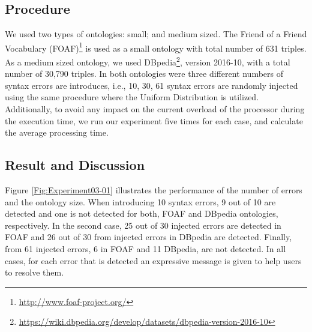 \subsection{Procedure}

We used two types of ontologies: small; and medium sized. 
The Friend of a Friend Vocabulary (FOAF)\footnote{\url{http://www.foaf-project.org/}} is used as a small ontology with total number of 631 triples. 
As a medium sized ontology, we used DBpedia\footnote{\url{https://wiki.dbpedia.org/develop/datasets/dbpedia-version-2016-10}}, version 2016-10, with a total number of 30,790 triples. 
In both ontologies were three different numbers of syntax errors are introduces, i.e., 10, 30, 61 syntax errors are randomly injected using the same procedure where the Uniform Distribution is utilized.
Additionally, to avoid any impact on the current overload of the processor during the execution time, we run our experiment five times for each case, and calculate the average processing time.

 
\subsection{Result and Discussion}

Figure \ref{Fig:Experiment03-01} illustrates the performance of the number of errors and the ontology size. 
When introducing 10 syntax errors, 9 out of 10 are detected and one is not detected for both, FOAF and DBpedia ontologies, respectively. 
In the second case, 25 out of 30 injected errors are detected in FOAF and 26 out of 30 from injected errors in DBpedia are detected. 
Finally, from 61 injected errors, 6 in FOAF and 11 DBpedia, are not detected.
In all cases, for each error that is detected an expressive message is given to help users to resolve them. 

